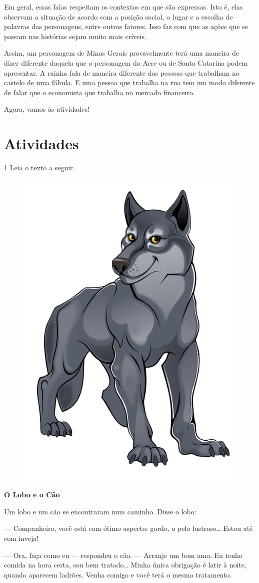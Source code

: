 \begin{conteudo}
\begin{conteudo}
\begin{conteudo}
\begin{conteudo}
{Em geral, essas falas respeitam os contextos em que são expressas.
Isto é, elas observam a situação de acordo com a posição social,
o lugar e a escolha de palavras das personagens, entre outros fatores. 
Isso faz com que as ações que se passam nas histórias sejam muito mais críveis.

Assim, um personagem de Minas Gerais provavelmente terá uma maneira
de dizer diferente daquela que o personagem do Acre ou de Santa Catarina podem apresentar.
A rainha fala de maneira diferente das pessoas que trabalham no castelo
de uma fábula. E uma pessoa que trabalha na rua tem um modo diferente de 
falar que o economista que trabalha no mercado financeiro.

Agora, vamos às atividades!
}

\section*{Atividades}

\num{1} Leia o texto a seguir.


\begin{myquote}
\begin{figure}
\includegraphics[width=.3\textwidth]{media/image22.png}
\end{figure}

\textbf{O Lobo e o Cão}

Um lobo e um cão se encontraram num caminho. Disse o lobo:

--- Companheiro, você está com ótimo aspecto: gordo, o pelo
lustroso\ldots{} Estou até com inveja!

--- Ora, faça como eu --- respondeu o cão. --- Arranje um bom amo. Eu
tenho comida na hora certa, sou bem tratado\ldots{} Minha única
obrigação é latir à noite, quando aparecem ladrões. Venha comigo e você
terá o mesmo tratamento.


\end{myquote}
\end{conteudo}
\end{conteudo}
\end{conteudo}
\end{conteudo}
